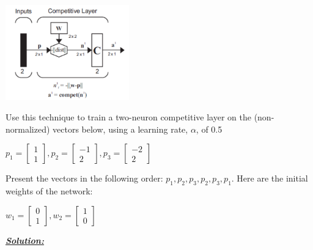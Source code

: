 \documentclass{article}
\begin{document}
\begin{center}
    \includegraphics[width=0.4\textwidth]{pr3.png}
\end{center}

\noindent Use this technique to train a two-neuron competitive layer on the (non-normalized) 
vectors below, using a learning rate, $\alpha$, of 0.5 

\begin{center}
    $p_1 = \begin{bmatrix}
        1\\
        1
      \end{bmatrix}, p_2 = \begin{bmatrix}
        -1\\
        2
      \end{bmatrix}, p_3 = \begin{bmatrix}
        -2 \\
        2
      \end{bmatrix}$
\end{center}

\noindent Present the vectors in the following order: $p_1, p_2, p_3, p_2, p_3, p_1$. 
Here are the initial weights of the network: 

\begin{center}
    $w_1 = \begin{bmatrix}
        0\\
        1
      \end{bmatrix}, w_2 = \begin{bmatrix}
        1\\
        0
      \end{bmatrix}$
      \vspace{1cm}
\end{center}

\noindent \underline{\textbf{\textit{Solution:}}}
\end{document}
